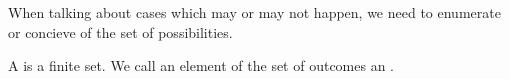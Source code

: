 
\sbasic




\sstart
{}


When talking about cases which
may or may not happen, we need
to enumerate or concieve of the
set of possibilities.


A 
is a finite set.
We call an element of the
set of outcomes an .
\strats
